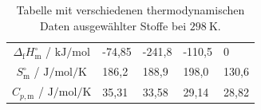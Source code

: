 \documentclass[./main.tex]{subfiles}
\begin{document}
\begin{table}[H]
    \caption{Tabelle mit verschiedenen thermodynamischen Daten ausgew\"ahlter Stoffe bei $\SI{298}{\kelvin}$.}
    \label{tab: 2025-10-3_therm. Daten2}
    \centering
    \begin{tabular}{cC{1.5cm}C{1.5cm}C{1.5cm}C{1.5cm}}
    \toprule
        &  &  &  & \\\midrule
        $\Delta_\mathrm{f}H^{\circ}_\mathrm{m}$ / $\si{\kilo\joule\per\mole}$ & -74,85 & -241,8 & -110,5 & 0\\
        $S^{\circ}_\mathrm{m}$ / $\si{\joule\per\mole\per\kelvin}$ & 186,2 & 188,9 & 198,0 & 130,6\\
        $C_{p, \mathrm{m}}$ / $\si{\joule\per\mole\per\kelvin}$ & 35,31 & 33,58 & 29,14 & 28,82\\\bottomrule
    \end{tabular}
\end{table}
\aufgabenende

\end{document}

